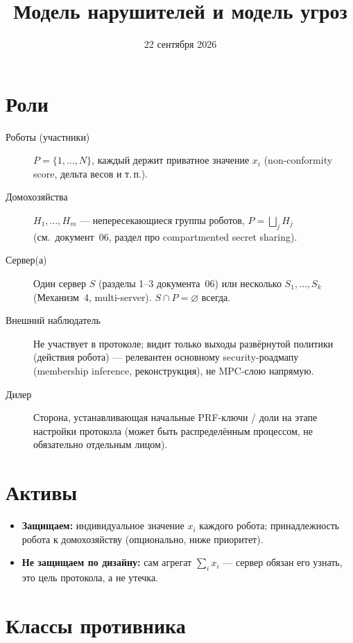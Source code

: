 \documentclass[11pt]{article}
\title{Модель нарушителей и модель угроз}
\author{}
\date{22 сентября 2026}
\begin{document}
\maketitle

\section{Роли}

\begin{description}
  \item[Роботы (участники)] $P=\{1,\dots,N\}$, каждый держит приватное значение
    $x_i$ (non-conformity score, дельта весов и т.\,п.).
  \item[Домохозяйства] $H_1,\dots,H_m$ — непересекающиеся группы роботов,
    $P=\bigsqcup_j H_j$ (см.\ документ~06, раздел про compartmented secret
    sharing).
  \item[Сервер(а)] Один сервер $S$ (разделы 1--3 документа~06) или несколько
    $S_1,\dots,S_k$ (Механизм~4, multi-server). $S \cap P = \varnothing$ всегда.
  \item[Внешний наблюдатель] Не участвует в протоколе; видит только выходы
    развёрнутой политики (действия робота) — релевантен основному
    security-роадмапу (membership inference, реконструкция), не MPC-слою напрямую.
  \item[Дилер] Сторона, устанавливающая начальные PRF-ключи / доли на этапе
    настройки протокола (может быть распределённым процессом, не обязательно
    отдельным лицом).
\end{description}

\section{Активы}

\begin{itemize}
  \item \textbf{Защищаем:} индивидуальное значение $x_i$ каждого робота;
    принадлежность робота к домохозяйству (опционально, ниже приоритет).
  \item \textbf{Не защищаем по дизайну:} сам агрегат $\sum_i x_i$ — сервер обязан
    его узнать, это цель протокола, а не утечка.
\end{itemize}

\section{Классы противника}
\end{document}

